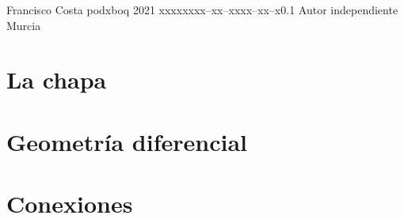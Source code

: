 \documentclass{tstextbook}
\begin{document}
    {Francisco Costa}
    {podxboq}
    {2021}
    {xxxxx}{xxx--xx--xxxx--xx--x}{0.1}
    {Autor independiente}
    {Murcia}

    \printglossaries

    \chapter{La chapa}\label{ch:la-chapa}
    

%    
%
%    
%
%    
%
%    
%
    \chapter{Geometría diferencial}\label{ch:geometria-diferencial}
    
%
    \chapter{Conexiones}\label{ch:conexiones}
    
%
%    


    \printbibliography{}
    \printindex
\end{document}
